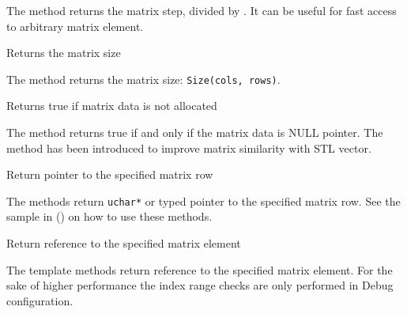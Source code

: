 The method returns the matrix step, divided by . It can be useful for fast access to arbitrary matrix element.

Returns the matrix size


The method returns the matrix size: \texttt{Size(cols, rows)}.

Returns true if matrix data is not allocated


The method returns true if and only if the matrix data is NULL pointer. The method has been introduced to improve matrix similarity with STL vector.

Return pointer to the specified matrix row

\begin{description}
\end{description}

The methods return \texttt{uchar*} or typed pointer to the specified matrix row. See the sample in () on how to use these methods.

Return reference to the specified matrix element

\begin{description}
\end{description}

The template methods return reference to the specified matrix element. For the sake of higher performance the index range checks are only performed in Debug configuration.

